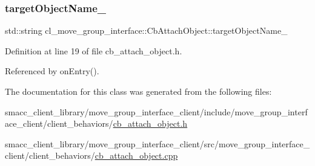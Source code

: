 \subsubsection{\texorpdfstring{target\+Object\+Name\+\_\+}{targetObjectName\_}}
{\footnotesize\ttfamily std\+::string cl\+\_\+move\+\_\+group\+\_\+interface\+::\+Cb\+Attach\+Object\+::target\+Object\+Name\+\_\+}



Definition at line 19 of file cb\+\_\+attach\+\_\+object.\+h.



Referenced by on\+Entry().



The documentation for this class was generated from the following files\+:\begin{DoxyCompactItemize}
\item 
smacc\+\_\+client\+\_\+library/move\+\_\+group\+\_\+interface\+\_\+client/include/move\+\_\+group\+\_\+interface\+\_\+client/client\+\_\+behaviors/\hyperlink{cb__attach__object_8h}{cb\+\_\+attach\+\_\+object.\+h}\item 
smacc\+\_\+client\+\_\+library/move\+\_\+group\+\_\+interface\+\_\+client/src/move\+\_\+group\+\_\+interface\+\_\+client/client\+\_\+behaviors/\hyperlink{cb__attach__object_8cpp}{cb\+\_\+attach\+\_\+object.\+cpp}\end{DoxyCompactItemize}
